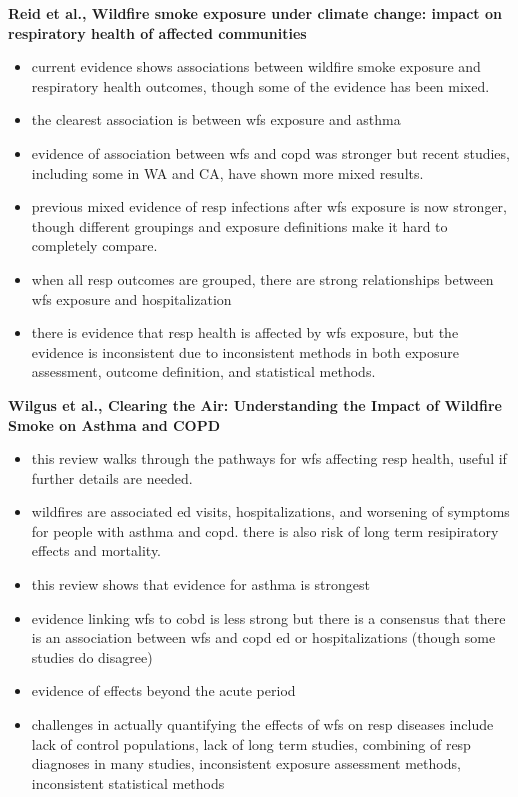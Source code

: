 \textbf{Reid et al., Wildfire smoke exposure under climate change: impact on respiratory health of affected communities}
\begin{itemize}
    \item current evidence shows associations between wildfire smoke exposure and respiratory health outcomes, though some of the evidence has been mixed. 
    \item the clearest association is between wfs exposure and asthma
    \item evidence of association between wfs and copd was stronger but recent studies, including some in WA and CA, have shown more mixed results. 
    \item previous mixed evidence of resp infections after wfs exposure is now stronger, though different groupings and exposure definitions make it hard to completely compare. 
    \item when all resp outcomes are grouped, there are strong relationships between wfs exposure and hospitalization
    \item there is evidence that resp health is affected by wfs exposure, but the evidence is inconsistent due to inconsistent methods in both exposure assessment, outcome definition, and statistical methods. 
\end{itemize}

\textbf{Wilgus et al., Clearing the Air: Understanding the Impact of Wildfire Smoke on Asthma and COPD}
\begin{itemize}
    \item this review walks through the pathways for wfs affecting resp health, useful if further details are needed. 
    \item wildfires are associated ed visits, hospitalizations, and worsening of symptoms for people with asthma and copd. there is also risk of long term resipiratory effects and mortality. 
    \item this review shows that evidence for asthma is strongest
    \item evidence linking wfs to cobd is less strong but there is a consensus that there is an association between wfs and copd ed or hospitalizations (though some studies do disagree)
    \item evidence of effects beyond the acute period
    \item challenges in actually quantifying the effects of wfs on resp diseases include lack of control populations, lack of long term studies, combining of resp diagnoses in many studies, inconsistent exposure assessment methods, inconsistent statistical methods
\end{itemize}




